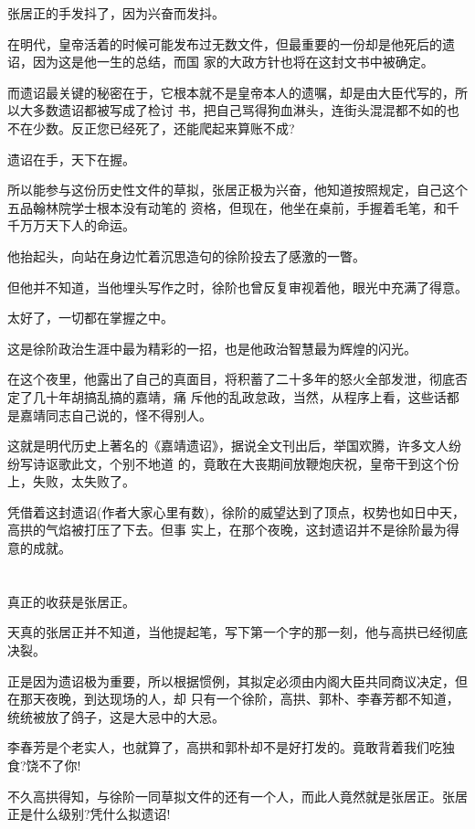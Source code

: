 \documentclass[11pt,a4paper,onecolumn]{article}
\begin{document}
张居正的手发抖了，因为兴奋而发抖。

在明代，皇帝活着的时候可能发布过无数文件，但最重要的一份却是他死后的遗诏，因为这是他一生的总结，而国
家的大政方针也将在这封文书中被确定。

而遗诏最关键的秘密在于，它根本就不是皇帝本人的遗嘱，却是由大臣代写的，所以大多数遗诏都被写成了检讨
书，把自己骂得狗血淋头，连街头混混都不如的也不在少数。反正您已经死了，还能爬起来算账不成?

遗诏在手，天下在握。

所以能参与这份历史性文件的草拟，张居正极为兴奋，他知道按照规定，自己这个五品翰林院学士根本没有动笔的
资格，但现在，他坐在桌前，手握着毛笔，和千千万万天下人的命运。

他抬起头，向站在身边忙着沉思造句的徐阶投去了感激的一瞥。

但他并不知道，当他埋头写作之时，徐阶也曾反复审视着他，眼光中充满了得意。

太好了，一切都在掌握之中。

这是徐阶政治生涯中最为精彩的一招，也是他政治智慧最为辉煌的闪光。

在这个夜里，他露出了自己的真面目，将积蓄了二十多年的怒火全部发泄，彻底否定了几十年胡搞乱搞的嘉靖，痛
斥他的乱政怠政，当然，从程序上看，这些话都是嘉靖同志自己说的，怪不得别人。

这就是明代历史上著名的《嘉靖遗诏》，据说全文刊出后，举国欢腾，许多文人纷纷写诗讴歌此文，个别不地道
的，竟敢在大丧期间放鞭炮庆祝，皇帝干到这个份上，失败，太失败了。

凭借着这封遗诏(作者大家心里有数)，徐阶的威望达到了顶点，权势也如日中天，高拱的气焰被打压了下去。但事
实上，在那个夜晚，这封遗诏并不是徐阶最为得意的成就。

\section[\thesection]{}

真正的收获是张居正。

天真的张居正并不知道，当他提起笔，写下第一个字的那一刻，他与高拱已经彻底决裂。

正是因为遗诏极为重要，所以根据惯例，其拟定必须由内阁大臣共同商议决定，但在那天夜晚，到达现场的人，却
只有一个徐阶，高拱、郭朴、李春芳都不知道，统统被放了鸽子，这是大忌中的大忌。

李春芳是个老实人，也就算了，高拱和郭朴却不是好打发的。竟敢背着我们吃独食?饶不了你!

不久高拱得知，与徐阶一同草拟文件的还有一个人，而此人竟然就是张居正。张居正是什么级别?凭什么拟遗诏!
\end{document}
